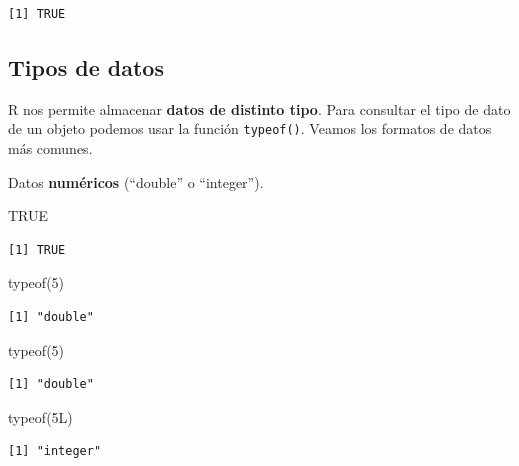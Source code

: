 \documentclass[
  letterpaper,
  DIV=11,
  numbers=noendperiod]{scrartcl}
\newenvironment{Shaded}{\begin{snugshade}}{\end{snugshade}}
\newcommand{\ConstantTok}[1]{\textcolor[rgb]{0.56,0.35,0.01}{#1}}
\newcommand{\DecValTok}[1]{\textcolor[rgb]{0.68,0.00,0.00}{#1}}
\newcommand{\FunctionTok}[1]{\textcolor[rgb]{0.28,0.35,0.67}{#1}}
\newcommand{\NormalTok}[1]{\textcolor[rgb]{0.00,0.23,0.31}{#1}}
\begin{document}
\begin{verbatim}
[1] TRUE
\end{verbatim}

\subsection{Tipos de datos}\label{tipos-de-datos}

R nos permite almacenar \textbf{datos de distinto tipo}. Para consultar
el tipo de dato de un objeto podemos usar la función \texttt{typeof()}.
Veamos los formatos de datos más comunes.

Datos \textbf{numéricos} (``double'' o ``integer'').

\begin{Shaded}
\begin{Highlighting}[]
\ConstantTok{TRUE} 
\end{Highlighting}
\end{Shaded}

\begin{verbatim}
[1] TRUE
\end{verbatim}

\begin{Shaded}
\begin{Highlighting}[]
\FunctionTok{typeof}\NormalTok{(}\DecValTok{5}\NormalTok{) }
\end{Highlighting}
\end{Shaded}

\begin{verbatim}
[1] "double"
\end{verbatim}

\begin{Shaded}
\begin{Highlighting}[]
\FunctionTok{typeof}\NormalTok{(}\DecValTok{5}\NormalTok{) }
\end{Highlighting}
\end{Shaded}

\begin{verbatim}
[1] "double"
\end{verbatim}

\begin{Shaded}
\begin{Highlighting}[]
\FunctionTok{typeof}\NormalTok{(}\DecValTok{5}\NormalTok{L)}
\end{Highlighting}
\end{Shaded}

\begin{verbatim}
[1] "integer"
\end{verbatim}
\end{document}
